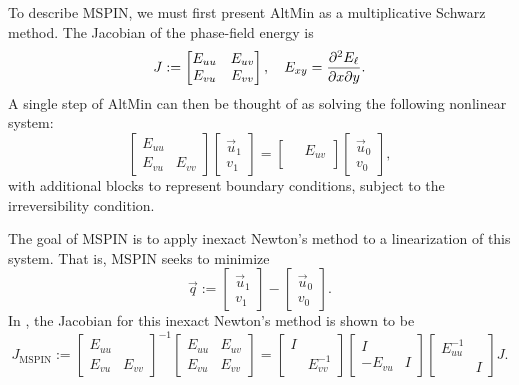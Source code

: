 \documentclass{article}
\DeclareMathOperator{\mspin}{MSPIN}
\numberwithin{equation}{section}
\begin{document}
To describe MSPIN, we must first present AltMin as a multiplicative Schwarz method.
The Jacobian of the phase-field energy is
\begin{equation} \label{eq: jacobian}
	J := \begin{bmatrix} E_{uu} & E_{uv} \\ E_{vu} & E_{vv} \end{bmatrix}, \quad E_{xy} = \frac{\partial^2 E_\ell}{\partial x \partial y}.
\end{equation}
A single step of AltMin can then be thought of as solving the following nonlinear system:
\begin{equation*}
	\begin{bmatrix} E_{uu} \\ E_{vu} & E_{vv} \end{bmatrix} \begin{bmatrix} \vec{u}_1 \\ v_1 \end{bmatrix} = \begin{bmatrix} ~ & E_{uv} \\ & ~ \end{bmatrix} \begin{bmatrix} \vec{u}_0 \\ v_0 \end{bmatrix},
\end{equation*}
with additional blocks to represent boundary conditions, subject to the irreversibility condition.

The goal of MSPIN is to apply inexact Newton's method to a linearization of this system.
That is, MSPIN seeks to minimize
\begin{equation*}
	\vec{q} := \begin{bmatrix} \vec{u}_1 \\ v_1 \end{bmatrix} - \begin{bmatrix} \vec{u}_0 \\ v_0 \end{bmatrix}.
\end{equation*}
In \cite{cai, liu, 3k}, the Jacobian for this inexact Newton's method is shown to be
\begin{equation*}
	J_{\mspin} := \begin{bmatrix} E_{uu} \\ E_{vu} & E_{vv} \end{bmatrix}^{-1} \begin{bmatrix} E_{uu} & E_{uv} \\ E_{vu} & E_{vv} \end{bmatrix}
	= \begin{bmatrix} I \\ & E_{vv}^{-1} \end{bmatrix} \begin{bmatrix} I \\ -E_{vu} & I \end{bmatrix} \begin{bmatrix} E_{uu}^{-1} \\ & I \end{bmatrix} J.
\end{equation*}
\end{document}
